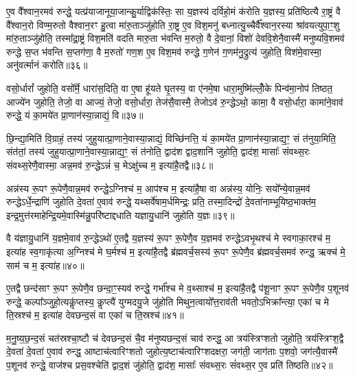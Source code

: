 ए॒व वै᳚श्वान॒रमव॑ रुन्द्धे॒ यत्प्र॑याजानूया॒जान्कु॒र्याद्विक॑स्तिः॒ सा य॒ज्ञस्य॑ दर्विहो॒मं क॑रोति य॒ज्ञस्य॒ प्रति॑ष्ठित्यै रा॒ष्ट्रं वै वै᳚श्वान॒रो विण्म॒रुतो वैश्वान॒रꣳ हु॒त्वा मा॑रु॒ताञ्जु॑होति रा॒ष्ट्र ए॒व विश॒मनु॑ बध्नात्यु॒च्चैर्वै᳚श्वान॒रस्या श्रा॑वयत्युपा॒ꣳ॒शु मा॑रु॒ताञ्जु॑होति॒ तस्मा᳚द्रा॒ष्ट्रं विश॒मति॑ वदति मारु॒ता भ॑वन्ति म॒रुतो॒ वै दे॒वानां॒ विशो॑ देववि॒शेनै॒वास्मै॑ मनुष्यवि॒शमव॑ रुन्द्धे स॒प्त भ॑वन्ति स॒प्तग॑णा॒ वै म॒रुतो॑ गण॒श ए॒व विश॒मव॑ रुन्द्धे ग॒णेन॑ ग॒णम॑नु॒द्रुत्य॑ जुहोति॒ विश॑मे॒वास्मा॒ अनु॑वर्त्मानं करोति॥३६॥

{\anuvakamend[{अग्ने॒ प्रेह्यव॑ स्म दुहे॒ तां प्र॒जाप॑तेः सा॒क्षान्म॑नुष्यवि॒शमेक॑विꣳशतिश्च॥७॥}]}

वसो॒र्धारां᳚ जुहोति॒ वसो᳚र्मे॒ धारा॑स॒दिति॒ वा ए॒षा हू॑यते घृ॒तस्य॒ वा ए॑नमे॒षा धारा॒मुष्मि॑ल्लोँ॒के पिन्व॑मा॒नोप॑ तिष्ठत॒ आज्ये॑न जुहोति॒ तेजो॒ वा आज्यं॒ तेजो॒ वसो॒र्धारा॒ तेज॑सै॒वास्मै॒ तेजो\-ऽव॑ रु॒न्द्धे\-ऽथो॒ कामा॒ वै वसो॒र्धारा॒ कामा॑ने॒वाव॑ रुन्द्धे॒ यं का॒मये॑त प्रा॒णान॑स्या॒न्नाद्यं॒ वि॥३७॥

छि॒न्द्या॒मिति॑ वि॒ग्राहं॒ तस्य॑ जुहुयात्प्रा॒णाने॒वास्या॒न्नाद्यं॒ विच्छि॑नत्ति॒ यं का॒मये॑त प्रा॒णान॑स्या॒न्नाद्य॒ꣳ॒ सं त॑नुया॒मिति॒ संत॑तां॒ तस्य॑ जुहुयात्प्रा॒णाने॒वास्या॒न्नाद्य॒ꣳ॒ सं त॑नोति॒ द्वाद॑श द्वाद॒शानि॑ जुहोति॒ द्वाद॑श॒ मासाः᳚ संवथ्स॒रः संवथ्स॒रेणै॒वास्मा॒ अन्न॒मव॑ रु॒न्द्धे\-ऽन्नं॑ च॒ मे\-ऽक्षु॑च्च म॒ इत्या॑है॒तद्वै॥३८॥

अन्न॑स्य रू॒पꣳ रू॒पेणै॒वान्न॒मव॑ रुन्द्धे॒\-ऽग्निश्च॑ म॒ आप॑श्च म॒ इत्या॑है॒षा वा अन्न॑स्य॒ योनिः॒ सयो᳚न्ये॒वान्न॒मव॑ रुन्द्धे\-ऽर्धे॒न्द्राणि॑ जुहोति दे॒वता॑ ए॒वाव॑ रुन्द्धे॒ यथ्सर्वे॑षाम॒र्धमिन्द्रः॒ प्रति॒ तस्मा॒दिन्द्रो॑ दे॒वता॑नाम्भूयिष्ठ॒भाक्त॑म॒ इन्द्र॒मुत्त॑रमाहेन्द्रि॒यमे॒वास्मि॑न्नु॒परि॑ष्टाद्दधाति यज्ञायु॒धानि॑ जुहोति य॒ज्ञः॥३९॥

वै य॑ज्ञायु॒धानि॑ य॒ज्ञमे॒वाव॑ रु॒न्द्धे\-ऽथो॑ ए॒तद्वै य॒ज्ञस्य॑ रू॒पꣳ रू॒पेणै॒व य॒ज्ञमव॑ रुन्द्धे\-ऽवभृ॒थश्च॑ मे स्वगाका॒रश्च॑ म॒ इत्या॑ह स्व॒गाकृ॑त्या अ॒ग्निश्च॑ मे घ॒र्मश्च॑ म॒ इत्या॑है॒तद्वै ब्र॑ह्मवर्च॒सस्य॑ रू॒पꣳ रू॒पेणै॒व ब्र॑ह्मवर्च॒समव॑ रुन्द्ध॒ ऋक्च॑ मे॒ साम॑ च म॒ इत्या॑ह॥४०॥

ए॒तद्वै छन्द॑साꣳ रू॒पꣳ रू॒पेणै॒व छन्दा॒ꣳ॒स्यव॑ रुन्द्धे॒ गर्भा᳚श्च मे व॒थ्साश्च॑ म॒ इत्या॑है॒तद्वै प॑शू॒नाꣳ रू॒पꣳ रू॒पेणै॒व प॒शूनव॑ रुन्द्धे॒ कल्पा᳚ञ्जुहो॒त्यकॢ॑प्तस्य॒ कॢप्त्यै॑ युग्मदयु॒जे जु॑होति मिथुन॒त्वायो᳚त्त॒राव॑ती भवतो॒\-ऽभिक्रा᳚न्त्या॒ एका॑ च मे ति॒स्रश्च॑ म॒ इत्या॑ह देवछन्द॒सं वा एका॑ च ति॒स्रश्च॑॥४१॥

म॒नु॒ष्य॒छ॒न्द॒सं चत॑स्रश्चा॒ष्टौ च॑ देवछन्द॒सं चै॒व म॑नुष्यछन्द॒सं चाव॑ रुन्द्ध॒ आ त्रय॑स्त्रिꣳशतो जुहोति॒ त्रय॑स्त्रिꣳश॒द्वै दे॒वता॑ दे॒वता॑ ए॒वाव॑ रुन्द्ध॒ आष्टाच॑त्वारिꣳशतो जुहोत्य॒ष्टाच॑त्वारिꣳशदक्षरा॒ जग॑ती॒ जाग॑ताः प॒शवो॒ जग॑त्यै॒वास्मै॑ प॒शूनव॑ रुन्द्धे॒ वाज॑श्च प्रस॒वश्चेति॑ द्वाद॒शं जु॑होति॒ द्वाद॑श॒ मासाः᳚ संवथ्स॒रः सं॑वथ्स॒र ए॒व प्रति॑ तिष्ठति॥४२॥


